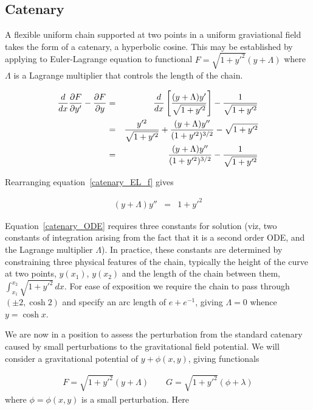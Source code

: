 \documentclass[pdflatex,sn-mathphys-num]{sn-jnl}%
\theoremstyle{thmstyleone}%
\theoremstyle{thmstyletwo}%
\theoremstyle{thmstylethree}%
\begin{document}
\subsection{Catenary}

A flexible uniform chain supported at two points in a uniform
graviational field takes the form of a catenary, a hyperbolic cosine.
This may be established by applying to Euler-Lagrange equation to
functional $F=\sqrt{1+y'^2}(y+\Lambda)$ where $\Lambda$ is a Lagrange
multiplier that controls the length of the chain.

\begin{eqnarray}
  \frac{d}{dx}\frac{\partial{F}}{\partial{y'}} - \frac{\partial{F}}{\partial{y}}
  &=& 
  \frac{d}{dx}\left[\frac{(y+\Lambda)y'}{\sqrt{1+y'^2}}\right] -  \frac{1}{\sqrt{1+y'^2}}\nonumber\\
&=&   \frac{y'^2}{\sqrt{1+y'^2}} + \frac{(y+\Lambda)y''}{(1+y'^2)^{3/2}} - \sqrt{1+y'^2}\nonumber\\
  &=&   \frac{(y+\Lambda)y''}{(1+y'^2)^{3/2}} - \frac{1}{\sqrt{1+y'^2}}
  \label{catenary_EL_f}
\end{eqnarray}

Rearranging equation~\ref{catenary_EL_f} gives

\begin{eqnarray}
  (y+\Lambda)y'' &=& 1+y'^2\label{catenary_ODE}
\end{eqnarray}

Equation~\ref{catenary_ODE} requires three constants for solution
(viz, two constants of integration arising from the fact that it is a
second order ODE, and the Lagrange multiplier $\Lambda$).  In
practice, these constants are determined by constraining three
physical features of the chain, typically the height of the curve at
two points, $y(x_1)$, $y(x_2)$ and the length of the chain between
them, $\int_{x_1}^{x_2}\sqrt{1+y'^2}\,dx$.  For ease of exposition we
require the chain to pass through $(\pm 2,\cosh 2)$ and specify an arc
length of $e+e^{-1}$, giving $\Lambda=0$ whence $y=\cosh x$.

We are now in a position to assess the perturbation from the standard
catenary caused by small perturbations to the gravitational field
potential.  We will consider a gravitational potential of $y +
\phi(x,y)$, giving functionals

\begin{eqnarray}\label{FandG}
F = \sqrt{1+y'^2}(y + \Lambda)\qquad G =  \sqrt{1+y'^2}(\phi + \lambda)
\end{eqnarray}
%
where $\phi=\phi(x,y)$ is a small perturbation.  Here 
\end{document}

